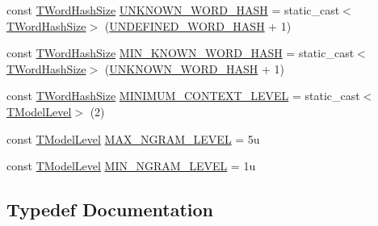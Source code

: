 \begin{DoxyCompactItemize}
\item 
const \hyperlink{namespaceuva_1_1smt_1_1hashing_acdc1f2765e669283f8e9c1ed42705314}{T\+Word\+Hash\+Size} \hyperlink{namespaceuva_1_1smt_1_1tries_ab8e95ae5121d967a11fc70ad49b824cf}{U\+N\+K\+N\+O\+W\+N\+\_\+\+W\+O\+R\+D\+\_\+\+H\+A\+S\+H} = static\+\_\+cast$<$\hyperlink{namespaceuva_1_1smt_1_1hashing_acdc1f2765e669283f8e9c1ed42705314}{T\+Word\+Hash\+Size}$>$ (\hyperlink{namespaceuva_1_1smt_1_1tries_a9b5fbcd66b62775091f4c2e9c28b1db9}{U\+N\+D\+E\+F\+I\+N\+E\+D\+\_\+\+W\+O\+R\+D\+\_\+\+H\+A\+S\+H} + 1)
\item 
const \hyperlink{namespaceuva_1_1smt_1_1hashing_acdc1f2765e669283f8e9c1ed42705314}{T\+Word\+Hash\+Size} \hyperlink{namespaceuva_1_1smt_1_1tries_ad6efe97228b9a8b89f2f0d2a7a2c7ddb}{M\+I\+N\+\_\+\+K\+N\+O\+W\+N\+\_\+\+W\+O\+R\+D\+\_\+\+H\+A\+S\+H} = static\+\_\+cast$<$\hyperlink{namespaceuva_1_1smt_1_1hashing_acdc1f2765e669283f8e9c1ed42705314}{T\+Word\+Hash\+Size}$>$ (\hyperlink{namespaceuva_1_1smt_1_1tries_ab8e95ae5121d967a11fc70ad49b824cf}{U\+N\+K\+N\+O\+W\+N\+\_\+\+W\+O\+R\+D\+\_\+\+H\+A\+S\+H} + 1)
\item 
const \hyperlink{namespaceuva_1_1smt_1_1hashing_acdc1f2765e669283f8e9c1ed42705314}{T\+Word\+Hash\+Size} \hyperlink{namespaceuva_1_1smt_1_1tries_a1b0ab780d7a692242e66beb30e92dfab}{M\+I\+N\+I\+M\+U\+M\+\_\+\+C\+O\+N\+T\+E\+X\+T\+\_\+\+L\+E\+V\+E\+L} = static\+\_\+cast$<$\hyperlink{namespaceuva_1_1smt_1_1tries_a26064146e98856c7c4185efab0e61a36}{T\+Model\+Level}$>$ (2)
\item 
const \hyperlink{namespaceuva_1_1smt_1_1tries_a26064146e98856c7c4185efab0e61a36}{T\+Model\+Level} \hyperlink{namespaceuva_1_1smt_1_1tries_ad08b42e58134f38a6aa8af8591035ab9}{M\+A\+X\+\_\+\+N\+G\+R\+A\+M\+\_\+\+L\+E\+V\+E\+L} = 5u
\item 
const \hyperlink{namespaceuva_1_1smt_1_1tries_a26064146e98856c7c4185efab0e61a36}{T\+Model\+Level} \hyperlink{namespaceuva_1_1smt_1_1tries_aaa0549945bf349e9796dcffd7824ffa1}{M\+I\+N\+\_\+\+N\+G\+R\+A\+M\+\_\+\+L\+E\+V\+E\+L} = 1u
\end{DoxyCompactItemize}


\subsection{Typedef Documentation}
\hypertarget{namespaceuva_1_1smt_1_1tries_a320b838ead9f4f7ce1ca28f18acef6ec}{}
